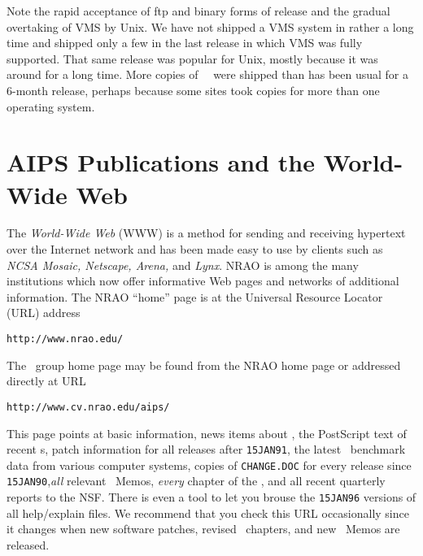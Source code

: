 Note the rapid acceptance of ftp and binary forms of release and the
gradual overtaking of VMS by Unix.  We have not shipped a VMS system
in rather a long time and shipped only a few in the last release in
which VMS was fully supported.  That same release was popular for
Unix, mostly because it was around for a long time.  More copies of
\OLDNAME\ \AIPS\ were shipped than has been usual for a 6-month
release, perhaps because some sites took copies for more than one
operating system.

\section{AIPS Publications and the World-Wide Web}

     The {\it World-Wide Web\/} (WWW) is a method for sending and
receiving hypertext over the Internet network and has been made easy
to use by clients such as {\it NCSA Mosaic, Netscape, Arena,\/} and
{\it Lynx\/}.  NRAO is among the many institutions which now offer
informative Web pages and networks of additional information.  The
NRAO ``home'' page is at the Universal Resource Locator (URL) address
\begin{center}
\vskip -10pt
{\tt http://www.nrao.edu/}
\vskip -10pt
\end{center}
The \AIPS\ group home page may be found from the NRAO home page or
addressed directly at URL
\begin{center}
\vskip -10pt
{\tt http://www.cv.nrao.edu/aips/}
\vskip -10pt
\end{center}
This page points at basic information, news items about \AIPS, the
PostScript text of recent \AIPSLETTER s, patch information for all
releases after {\tt 15JAN91}, the latest \AIPS\ benchmark data from
various computer systems, copies of {\tt CHANGE.DOC} for every release
since {\tt 15JAN90},{\it all} relevant \AIPS\ Memos, {\it every}
chapter of the \Cookbook, and all recent quarterly reports to the
\hbox{NSF}.  There is even a tool to let you brouse the {\tt 15JAN96}
versions of all help/explain files.  We recommend that you check this
URL occasionally since it changes when new software patches, revised
\Cookbook\ chapters, and new \AIPS\ Memos are released.

